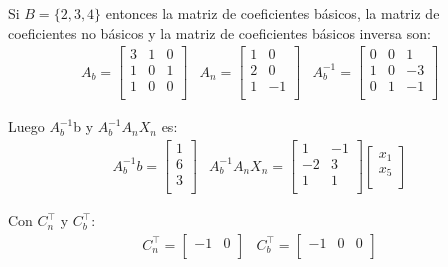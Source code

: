 \documentclass{article}
\begin{document}
\begin{flushleft}
		Si $B = \{2,3,4\}$ entonces la matriz de coeficientes básicos, la matriz de coeficientes no básicos y la matriz de coeficientes básicos inversa son:
		\begin{equation*}
			\begin{array}{ccc}
				A_b = \begin{bmatrix}
					3 & 1 & 0 \\
					1 & 0 & 1 \\
					1 & 0 & 0 \\
				\end{bmatrix} &
				A_n = \begin{bmatrix}
					1 & 0 \\
					2 & 0 \\
					1 & -1 \\
				\end{bmatrix} &
				A_b^{-1} = \begin{bmatrix}
					0 & 0 & 1\\
					1 & 0 & -3 \\
					0 & 1 & -1 \\
				\end{bmatrix}
			\end{array}
		\end{equation*}

		Luego $A_b^{-1}$b y $A_b^{-1}$$A_n$$X_n$ es:
		\begin{equation*}
			\begin{array}{cc}
				A_b^{-1}b = \begin{bmatrix}
					1 \\
					6 \\
					3 \\
				\end{bmatrix} &
				A_b^{-1}A_nX_n = \begin{bmatrix}
					1 & -1  \\
					-2 & 3 \\
					1 & 1 \\
				\end{bmatrix}
				\begin{bmatrix}
					x_1 \\
					x_5 \\
				\end{bmatrix}
			\end{array}
		\end{equation*}

		Con $C_n^\intercal$ y $C_b^\intercal$:
		\begin{equation*}
			\begin{array}{cc}
				C_n^\intercal = \begin{bmatrix}
					-1 & 0 \\
				\end{bmatrix} &
				C_b^\intercal = \begin{bmatrix}
					-1 & 0 & 0 \\
				\end{bmatrix}
			\end{array}
		\end{equation*}


\end{flushleft}
\end{document}

